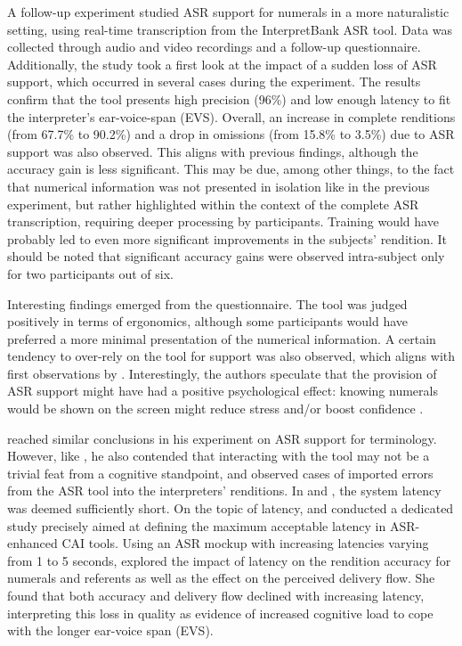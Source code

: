 A follow-up experiment \citep{defrancq_automatic_2020} studied ASR support for numerals in a more naturalistic setting, using real-time transcription from the InterpretBank ASR tool. Data was collected through audio and video recordings and a follow-up questionnaire. Additionally, the study took a first look at the impact of a sudden loss of ASR support, which occurred in several cases during the experiment. The results confirm that the tool presents high precision (96\%) and low enough latency to fit the interpreter's ear-voice-span (EVS). Overall, an increase in complete renditions (from 67.7\% to 90.2\%) and a drop in omissions (from 15.8\% to 3.5\%) due to ASR support was also observed. This aligns with previous findings, although the accuracy gain is less significant. This may be due, among other things, to the fact that numerical information was not presented in isolation like in the previous experiment, but rather highlighted within the context of the complete ASR transcription, requiring deeper processing by participants. Training would have probably led to even more significant improvements in the subjects' rendition. It should be noted that significant accuracy gains were observed intra-subject only for two participants out of six.

Interesting findings emerged from the questionnaire. The tool was judged positively in terms of ergonomics, although some participants would have preferred a more minimal presentation of the numerical information. A certain tendency to over-rely on the tool for support was also observed, which aligns with first observations by \citet{prandi_uso_2015, prandi_use_2015}. Interestingly, the authors speculate that the provision of ASR support might have had a positive psychological effect: knowing numerals would be shown on the screen might reduce stress and/or boost confidence \citep[93]{defrancq_automatic_2020}.

\citet{van_cauwenberghe_etude_2020} reached similar conclusions in his experiment on ASR support for terminology. However, like \citet{defrancq_automatic_2020}, he also contended that interacting with the tool may not be a trivial feat from a cognitive standpoint, and observed cases of imported errors from the ASR tool into the interpreters' renditions.  
In \citet{defrancq_automatic_2020} and \citet{van_cauwenberghe_etude_2020}, the system latency was deemed sufficiently short. On the topic of latency, \citet{montecchio_masterarbeit_maddalena_2021} and \citet{fantinuoliDefiningMaximumAcceptable2022} conducted a dedicated study precisely aimed at defining the maximum acceptable latency in ASR-enhanced CAI tools. Using an ASR mockup with increasing latencies varying from 1 to 5 seconds, \citet{montecchio_masterarbeit_maddalena_2021} explored the impact of latency on the rendition accuracy for numerals and referents as well as the effect on the perceived delivery flow. She found that both accuracy and delivery flow declined with increasing latency, interpreting this loss in quality as evidence of increased cognitive load to cope with the longer ear-voice span (EVS).

